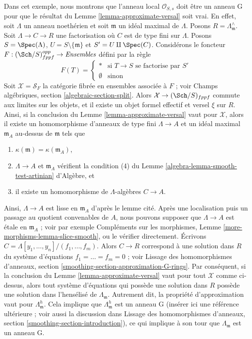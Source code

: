 \begin{example}
\label{example-approximate-versal-implies}
Dans cet exemple, nous montrons que l'anneau local $\mathcal{O}_{S, s}$ doit être
un anneau G pour que le résultat du Lemme \ref{lemma-approximate-versal}
soit vrai. En effet, soit $\Lambda$ un anneau noethérien et soit $\mathfrak m$
un idéal maximal de $\Lambda$. Posons $R = \Lambda_\mathfrak m^\wedge$. Soit
$\Lambda \to C \to R$ une factorisation où $C$ est de type fini sur
$\Lambda$. Posons $S = \Spec(\Lambda)$, $U = S \setminus \{\mathfrak m\}$ et
$S' = U \amalg \Spec(C)$. Considérons le foncteur
$F : (\Sch/S)_{fppf}^{opp} \to \textit{Ensembles}$ défini par la règle
$$
F(T) = 
\left\{
\begin{matrix}
* & \text{si }T \to S\text{ se factorise par }S' \\
\emptyset & \text{sinon}
\end{matrix}
\right.
$$
Soit $\mathcal{X} = \mathcal{S}_F$ la catégorie fibrée en ensembles associée
à $F$ ; voir Champs algébriques, section \ref{algebraic-section-split}.
Alors $\mathcal{X} \to (\Sch/S)_{fppf}$ commute aux limites sur les objets, et
il existe un objet formel effectif et versel $\xi$ sur $R$.
Ainsi, si la conclusion du Lemme \ref{lemma-approximate-versal} vaut
pour $\mathcal{X}$, alors il existe un homomorphisme d'anneaux de type fini $\Lambda \to A$
et un idéal maximal $\mathfrak m_A$ au-dessus de $\mathfrak m$ tels que
\begin{enumerate}
\item $\kappa(\mathfrak m) = \kappa(\mathfrak m_A)$,
\item $\Lambda \to A$ et $\mathfrak m_A$ vérifient la condition (4) du
Lemme \ref{algebra-lemma-smooth-test-artinian} d'Algèbre, et
\item il existe un homomorphisme de $\Lambda$-algèbres $C \to A$.
\end{enumerate}
Ainsi, $\Lambda \to A$ est lisse en $\mathfrak m_A$ d'après le lemme cité.
Après une localisation puis un passage au quotient convenables de $A$, nous pouvons supposer que $\Lambda \to A$ est \'etale en
$\mathfrak m_A$ ; voir par exemple
Compléments sur les morphismes, Lemme \ref{more-morphisms-lemma-slice-smooth},
ou le vérifier directement. Écrivons $C = \Lambda[y_1, \ldots, y_n]/(f_1, \ldots, f_m)$.
Alors $C \to R$ correspond à une solution dans $R$ du système d'équations
$f_1 = \ldots = f_m = 0$ ; voir Lissage des homomorphismes d'anneaux, section
\ref{smoothing-section-approximation-G-rings}.
Par conséquent, si la conclusion du
Lemme \ref{lemma-approximate-versal} vaut pour tout $\mathcal{X}$ comme
ci-dessus, alors tout système d'équations qui possède une solution dans $R$ possède une
solution dans l'hensélisé de $\Lambda_{\mathfrak m}$.
Autrement dit, la propriété d'approximation vaut pour
$\Lambda_{\mathfrak m}^h$. Cela implique que $\Lambda_{\mathfrak m}^h$
est un anneau G (insérer ici une référence ultérieure ; voir aussi la discussion dans
Lissage des homomorphismes d'anneaux, section \ref{smoothing-section-introduction}),
ce qui implique à son tour que $\Lambda_{\mathfrak m}$ est un anneau G.
\end{example}






